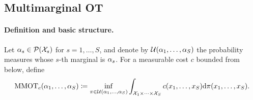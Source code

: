 \subsection{Multimarginal OT}
\label{sec-multimarginal-ot}
\label{subsec:multi-marginal}
\paragraph{Definition and basic structure.}
\begin{defn}\label{def-multimarginal-ot}
Let $\alpha_s\in\mathcal{P}(\mathcal{X}_s)$ for $s=1,\ldots,S$, and denote by
$\mathcal{U}(\alpha_1,\ldots,\alpha_S)$ the probability measures whose
$s$-th marginal is $\alpha_s$. For a measurable cost $c$ bounded from below,
define
\begin{equation}\label{eq-multimarginal-ot}
\operatorname{MMOT}_c(\alpha_1,\ldots,\alpha_S)
\coloneqq
\inf_{\pi\in\mathcal{U}(\alpha_1,\ldots,\alpha_S)}
\int_{\mathcal{X}_1\times\cdots\times\mathcal{X}_S}
c(x_1,\ldots,x_S)\mathrm{d}\pi(x_1,\ldots,x_S).
\end{equation}
\end{defn}
